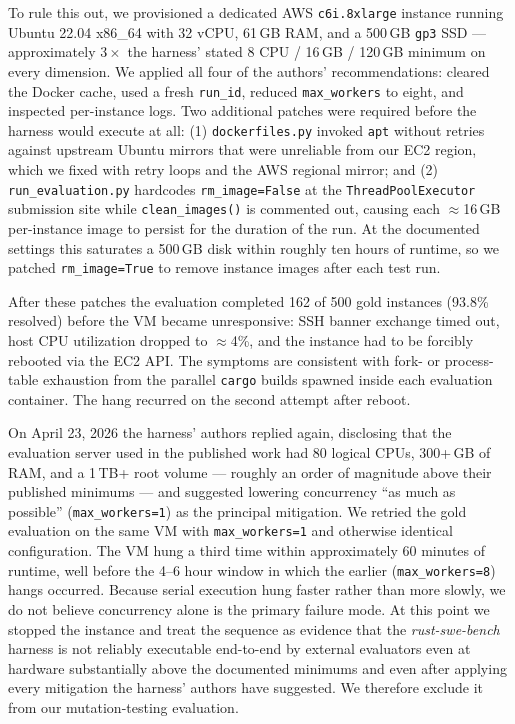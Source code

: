 \documentclass[10pt,conference, anon]{IEEEtran}
\begin{document}
To rule this out, we provisioned a dedicated AWS \texttt{c6i.8xlarge} instance running Ubuntu 22.04 x86\_64 with 32 vCPU, 61\,GB RAM, and a 500\,GB \texttt{gp3} SSD --- approximately $3\times$ the harness' stated 8 CPU / 16\,GB / 120\,GB minimum on every dimension. We applied all four of the authors' recommendations: cleared the Docker cache, used a fresh \texttt{run\_id}, reduced \texttt{max\_workers} to eight, and inspected per-instance logs. Two additional patches were required before the harness would execute at all: (1) \texttt{dockerfiles.py} invoked \texttt{apt} without retries against upstream Ubuntu mirrors that were unreliable from our EC2 region, which we fixed with retry loops and the AWS regional mirror; and (2) \texttt{run\_evaluation.py} hardcodes \texttt{rm\_image=False} at the \texttt{ThreadPoolExecutor} submission site while \texttt{clean\_images()} is commented out, causing each $\approx$16\,GB per-instance image to persist for the duration of the run. At the documented settings this saturates a 500\,GB disk within roughly ten hours of runtime, so we patched \texttt{rm\_image=True} to remove instance images after each test run.

After these patches the evaluation completed 162 of 500 gold instances (93.8\% resolved) before the VM became unresponsive: SSH banner exchange timed out, host CPU utilization dropped to $\approx$4\%, and the instance had to be forcibly rebooted via the EC2 API. The symptoms are consistent with fork- or process-table exhaustion from the parallel \texttt{cargo} builds spawned inside each evaluation container. The hang recurred on the second attempt after reboot.

On April 23, 2026 the harness' authors replied again, disclosing that the evaluation server used in the published work had 80 logical CPUs, 300+\,GB of RAM, and a 1\,TB+ root volume --- roughly an order of magnitude above their published minimums --- and suggested lowering concurrency ``as much as possible'' (\texttt{max\_workers=1}) as the principal mitigation. We retried the gold evaluation on the same VM with \texttt{max\_workers=1} and otherwise identical configuration. The VM hung a third time within approximately 60 minutes of runtime, well before the 4--6 hour window in which the earlier (\texttt{max\_workers=8}) hangs occurred. Because serial execution hung faster rather than more slowly, we do not believe concurrency alone is the primary failure mode. At this point we stopped the instance and treat the sequence as evidence that the \textit{rust-swe-bench} harness is not reliably executable end-to-end by external evaluators even at hardware substantially above the documented minimums and even after applying every mitigation the harness' authors have suggested. We therefore exclude it from our mutation-testing evaluation.
\end{document}
